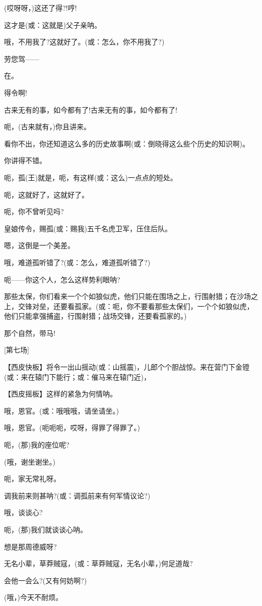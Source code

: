 (哎呀呀，)这还了得?!哼!

这才是(或：这就是)父子亲呐。

哦，不用我了?这就好了。(或：怎么，你不用我了?)

劳您驾------

在。

得令啊!

古来无有的事，如今都有了!古来无有的事，如今都有了!

呃，(古来就有，)你且讲来。

看你不出，你还知道这么多的历史故事啊(或：倒晓得这么些个历史的知识啊)。

你讲得不错。

呃，孤(王)就是，呃，有这样(或：这么)一点点的短处。

呃，这就好了，这就好了。

呃，你不曾听见吗?

皇娘传令，赐孤(或：赐我)五千名虎卫军，压住后队。

嗯，这倒是一个美差。

哦，难道孤听错了?(或：怎么，难道孤听错了?)

呃------你这个人，怎么这样势利眼呐?

那些太保，你们看来一个个如狼似虎，他们只能在围场之上，行围射猎；在沙场之上，交锋对垒，还要看孤家。(或：呃，你不要看那些太保们，一个个如狼似虎，他们只能拿强捕盗，行围射猎；战场交锋，还要看孤家的。)

那个自然，带马!

{[}第七场{]}

【西皮快板】将令一出山摇动(或：山摇震)，儿郎个个胆战惊。来在营门下金镫(或：来在辕门下能行；或：催马来在辕门近)，

【西皮摇板】这样的紧急为何情呐。

哦，恩官。(或：哦哦哦，请坐请坐。)

哦，恩官。(呃呃呃，哎呀，得罪了得罪了。)

呃，(那)我的座位呢?

(哦，谢坐谢坐。)

呃，家无常礼呀。

调我前来则甚呐?(或：调孤前来有何军情议论?)

哦，谈谈心?

呃，(那)我们就谈谈心呐。

想是那周德威呀?

无名小辈，草莽贼寇，(或：草莽贼寇，无名小辈，)何足道哉?

会他一会么?(又有何妨啊?)

(哦，)今天不耐烦。

